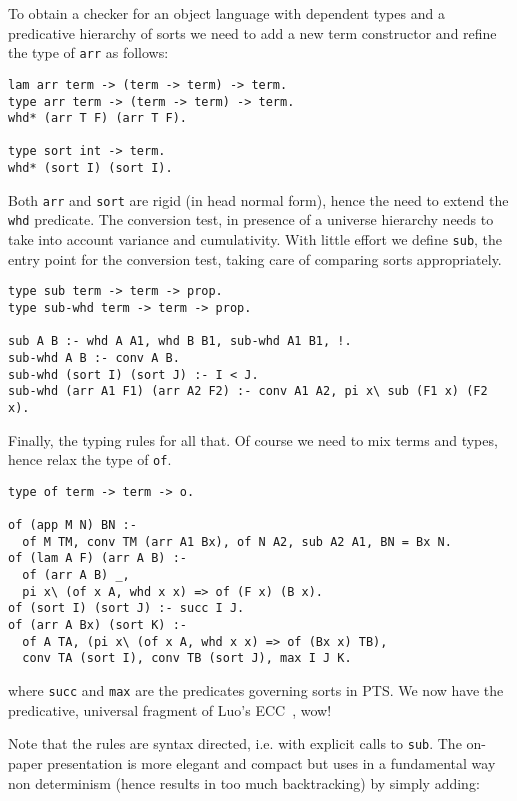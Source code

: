 \documentclass{easychair}
\begin{document}
To obtain a checker for an object language with dependent types and
a predicative hierarchy of sorts we need to add a new term constructor
and refine the type of \verb+arr+ as follows:

\begin{verbatim}
lam arr term -> (term -> term) -> term.
type arr term -> (term -> term) -> term.
whd* (arr T F) (arr T F).

type sort int -> term.
whd* (sort I) (sort I).
\end{verbatim}

Both \verb+arr+ and \verb+sort+ are rigid (in head normal form), hence the need to extend the \verb+whd+ predicate.  The conversion test, in presence of
a universe hierarchy needs to take into account variance and cumulativity.
With little effort we define \verb+sub+, the entry point for the conversion 
test, taking care of comparing sorts appropriately.

\begin{verbatim}
type sub term -> term -> prop.
type sub-whd term -> term -> prop.

sub A B :- whd A A1, whd B B1, sub-whd A1 B1, !.
sub-whd A B :- conv A B.
sub-whd (sort I) (sort J) :- I < J.
sub-whd (arr A1 F1) (arr A2 F2) :- conv A1 A2, pi x\ sub (F1 x) (F2 x).
\end{verbatim}

Finally, the typing rules for all that.  Of course we need to mix
terms and types, hence relax the type of \verb+of+.

\begin{verbatim}
type of term -> term -> o.

of (app M N) BN :-
  of M TM, conv TM (arr A1 Bx), of N A2, sub A2 A1, BN = Bx N.
of (lam A F) (arr A B) :-
  of (arr A B) _,
  pi x\ (of x A, whd x x) => of (F x) (B x).
of (sort I) (sort J) :- succ I J.
of (arr A Bx) (sort K) :-
  of A TA, (pi x\ (of x A, whd x x) => of (Bx x) TB),
  conv TA (sort I), conv TB (sort J), max I J K.
\end{verbatim}

where \verb+succ+ and \verb+max+ are the predicates governing sorts in
PTS.  We now have the predicative, universal fragment of Luo's
ECC~\cite{luo}, wow!

Note that the rules are syntax directed, i.e. with explicit calls to
\verb+sub+.  The on-paper presentation is more elegant and compact but 
uses in a fundamental way non determinism (hence results in too much
backtracking) by simply adding:
\end{document}
